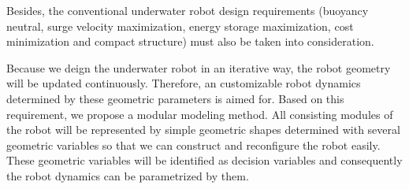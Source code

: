 

Besides, the conventional underwater robot design requirements (buoyancy neutral, surge velocity maximization, energy storage maximization, cost minimization and compact structure) must also be taken into consideration. 

Because we deign the underwater robot in an iterative way, the robot geometry will be updated continuously. Therefore, an customizable robot dynamics determined by these geometric parameters is aimed for.  
Based on this requirement, we propose a modular modeling method. All consisting modules of the robot will be represented by simple geometric shapes determined with several geometric variables so that we can construct and reconfigure the robot easily. These geometric variables will be identified as decision variables and consequently the robot dynamics can be parametrized by them.
 
